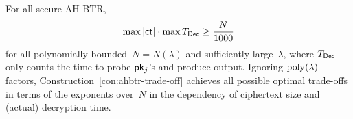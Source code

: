\begin{corollary}\label{cor:lower-bound}
For all secure AH-BTR,
\begin{align*}
\max{|\ct|}\cdot\max{\TDec}\geq\frac{N}{1000}
\end{align*}
for all polynomially bounded~${N=N(\lambda)}$ and sufficiently large~$\lambda$,
where $\TDec$ only counts the time to probe $\pk_j$'s and produce output.
Ignoring $\operatorname{poly}(\lambda)$ factors,
Construction~\ref{con:ahbtr-trade-off} achieves all possible optimal trade-offs
in terms of the exponents over~$N$ in the dependency of ciphertext size and (actual) decryption time.
\end{corollary}
